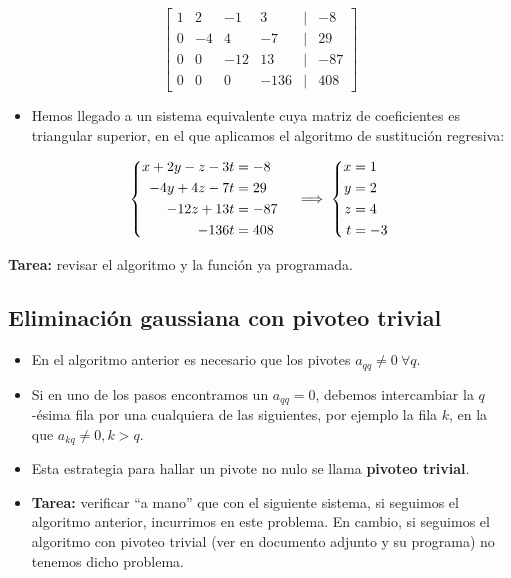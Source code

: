 \documentclass[openany]{book}
\providecommand{\tightlist}{%
  \setlength{\itemsep}{0pt}\setlength{\parskip}{0pt}}
\begin{document}
\[
\begin{bmatrix}
1 & 2 & -1 & 3 &|& -8\\
0 & -4 & 4 & -7 &|& 29\\
0 & 0 & -12 & 13 &|& -87\\
0 & 0 & 0 & -136 &|& 408  
\end{bmatrix}
\]

\begin{itemize}
\tightlist
\item
  Hemos llegado a un sistema equivalente cuya matriz de coeficientes es triangular superior, en el que aplicamos el algoritmo de sustitución regresiva:
\end{itemize}

\[
\left\{
\begin{aligned}
x+2y-z-3t &=-8 \cr
-4y+4z-7t &=29\cr
-12z+13t &=-87\cr
-136t &=408
\end{aligned}
\right.
\implies
\left\{
\begin{aligned}
x &= 1\\ y &= 2\\ z &= 4\\ t &= -3
\end{aligned}
\right.
\]

\textbf{Tarea:} revisar el algoritmo y la función ya programada.

\hypertarget{eliminaciuxf3n-gaussiana-con-pivoteo-trivial}{%
\subsection{Eliminación gaussiana con pivoteo trivial}\label{eliminaciuxf3n-gaussiana-con-pivoteo-trivial}}

\begin{itemize}
\tightlist
\item
  En el algoritmo anterior es necesario que los pivotes \(a_{qq} \neq 0 ~\forall q\).
\item
  Si en uno de los pasos encontramos un \(a_{qq} = 0\), debemos intercambiar la \(q\)-ésima fila por una cualquiera de las siguientes, por ejemplo la fila \(k\), en la que \(a_{kq} \neq 0, k>q\).
\item
  Esta estrategia para hallar un pivote no nulo se llama \textbf{pivoteo trivial}.
\item
  \textbf{Tarea:} verificar ``a mano'' que con el siguiente sistema, si seguimos el algoritmo anterior, incurrimos en este problema. En cambio, si seguimos el algoritmo con pivoteo trivial (ver en documento adjunto y su programa) no tenemos dicho problema.
\end{itemize}
\end{document}
